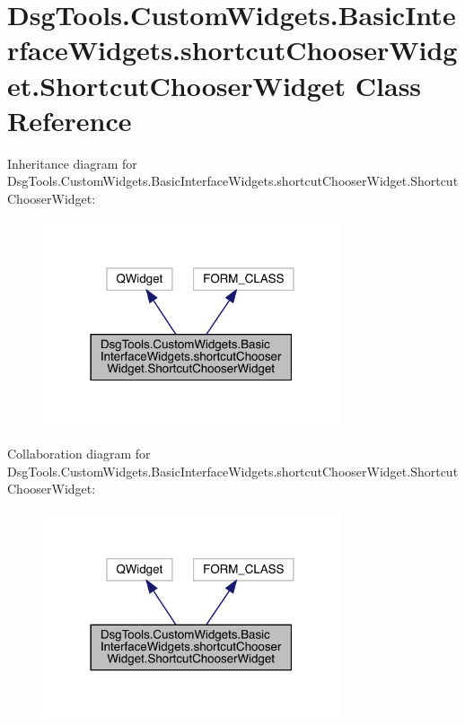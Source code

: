 \hypertarget{class_dsg_tools_1_1_custom_widgets_1_1_basic_interface_widgets_1_1shortcut_chooser_widget_1_1_shortcut_chooser_widget}{}\section{Dsg\+Tools.\+Custom\+Widgets.\+Basic\+Interface\+Widgets.\+shortcut\+Chooser\+Widget.\+Shortcut\+Chooser\+Widget Class Reference}
\label{class_dsg_tools_1_1_custom_widgets_1_1_basic_interface_widgets_1_1shortcut_chooser_widget_1_1_shortcut_chooser_widget}


Inheritance diagram for Dsg\+Tools.\+Custom\+Widgets.\+Basic\+Interface\+Widgets.\+shortcut\+Chooser\+Widget.\+Shortcut\+Chooser\+Widget\+:
\nopagebreak
\begin{figure}[H]
\begin{center}
\leavevmode
\includegraphics[width=249pt]{class_dsg_tools_1_1_custom_widgets_1_1_basic_interface_widgets_1_1shortcut_chooser_widget_1_1_shf12b0fa4f0b9051ed91afa0160e97964}
\end{center}
\end{figure}


Collaboration diagram for Dsg\+Tools.\+Custom\+Widgets.\+Basic\+Interface\+Widgets.\+shortcut\+Chooser\+Widget.\+Shortcut\+Chooser\+Widget\+:
\nopagebreak
\begin{figure}[H]
\begin{center}
\leavevmode
\includegraphics[width=249pt]{class_dsg_tools_1_1_custom_widgets_1_1_basic_interface_widgets_1_1shortcut_chooser_widget_1_1_sh7738dd94c372462ca572f68ff84daac0}
\end{center}
\end{figure}
